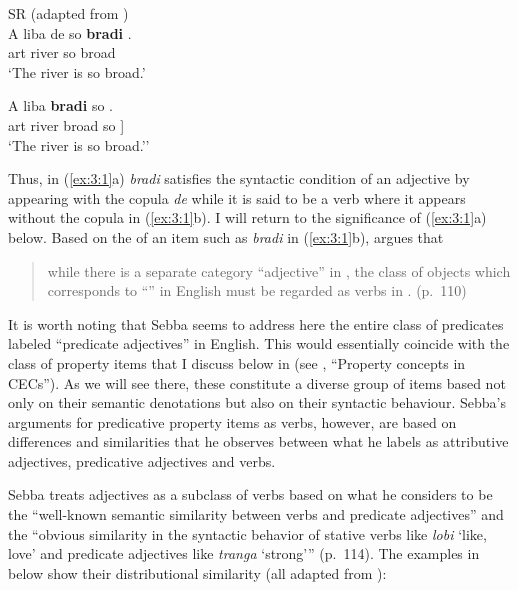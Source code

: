 \ea%
\label{ex:3:1}
SR (adapted from \citealt[112]{Sebba1986})\\
\ea
\gll A liba     de {\ob} so \textbf{bradi} {\cb}.\\
    art river {\COP} {}  so         broad {}\\
\glt `The river is so broad.'

\ex
\gll A liba {\ob} \textbf{bradi} so {\cb}.\\
	art river        {\ob} broad so ]\\
\glt `The river is so broad.'' \z \z

Thus, in (\ref{ex:3:1}a) \textit{bradi} satisfies the syntactic
condition of an adjective by appearing with the copula \textit{de}
while it is said to be a  verb where it appears without the
copula in (\ref{ex:3:1}b).  I will return to the significance of
(\ref{ex:3:1}a) below.  Based on the  of an item such
as \textit{bradi} in (\ref{ex:3:1}b), \citet{Sebba1986} argues that

\begin{quote}
while there is a separate category ``adjective” in  , the class
of objects which corresponds to ``” in English must
be regarded as verbs in . (p.~110)
\end{quote}

It is worth noting that Sebba seems to address here the entire class
of predicates labeled ``predicate adjectives'' in English.  This would
essentially coincide with the class of property items that I discuss
below in  (see , ``Property concepts
in CECs'').  As we will see there, these constitute a diverse group of
items based not only on their semantic denotations but also on their
syntactic behaviour.  Sebba’s arguments for predicative property items
as  verbs, however, are based on differences and similarities
that he observes between what he labels as attributive adjectives,
predicative adjectives and  verbs.

Sebba treats adjectives as a subclass of  verbs based on what
he considers to be the ``well-known semantic similarity between verbs
and predicate adjectives” and the ``obvious similarity in the syntactic
behavior of  stative verbs like \textit{lobi} `like, love' and
predicate adjectives like \textit{tranga} `strong'” (p.~114).  The
examples in  below show their distributional similarity (all
adapted from \citealt[114]{Sebba1986}):

